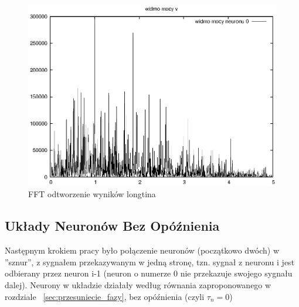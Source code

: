   \begin{figure}
    \includegraphics[width=140mm]{images/1neuron/3}
    \caption{FFT odtworzenie wyników longtina}
    \label{sym1fft}
  \end{figure}

  
  \subsection{Układy Neuronów Bez Opóźnienia}
  
  Następnym krokiem pracy było połączenie neuronów (początkowo dwóch) w ''sznur'', z sygnałem przekazywanym w jedną stronę, tzn. sygnał z neuronu i jest odbierany przez neuron i-1 (neuron o numerze 0 nie przekazuje swojego sygnału dalej). Neurony w układzie działały według równania zaproponowanego w rozdziale ~\ref{sec:przesuniecie_fazy}, bez opóźnienia (czyli $\tau_{n} = 0$)
  
